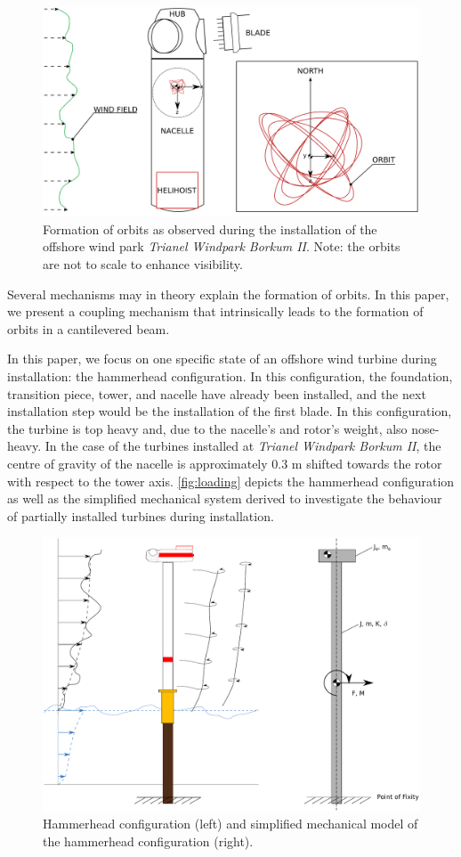 \documentclass{article}
\begin{document}
\begin{figure}[ht!]
    \centering
    \includegraphics[width=0.7\linewidth]{manuscript/figures/installation_alt2.png}
    \caption{Formation of orbits as observed during the installation of the offshore wind park \textit{Trianel Windpark Borkum II}. Note: the orbits are not to scale to enhance visibility.}
    \label{fig:orbit}
\end{figure}

Several mechanisms may in theory explain the formation of orbits. In this paper, we present a coupling mechanism that intrinsically leads to the formation of orbits in a cantilevered beam. 

In this paper, we focus on one specific state of an offshore wind turbine during installation: the hammerhead configuration. In this configuration, the foundation, transition piece, tower, and nacelle have already been installed, and the next installation step would be the installation of the first blade. In this configuration, the turbine is top heavy and, due to the nacelle's and rotor's weight, also nose-heavy. In the case of the turbines installed at \textit{Trianel Windpark Borkum II}, the centre of gravity of the nacelle is approximately 0.3 m shifted towards the rotor with respect to the tower axis. \autoref{fig:loading} depicts the hammerhead configuration as well as the simplified mechanical system derived to investigate the behaviour of partially installed turbines during installation. 

\begin{figure}[ht!]
    \centering
    \includegraphics[width=0.7\linewidth]{manuscript/figures/loading_3.pdf}
    \caption{Hammerhead configuration (left) and simplified mechanical model of the hammerhead configuration (right).}
    \label{fig:loading}
\end{figure}
\end{document}
